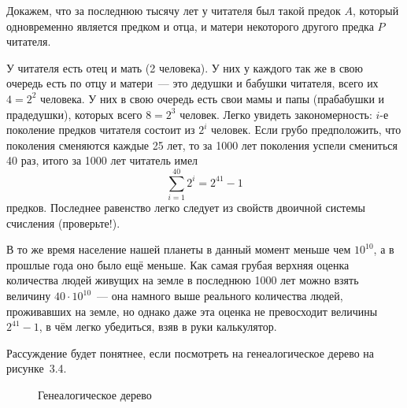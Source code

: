 \begin{example}
Докажем, что за последнюю тысячу лет у читателя был такой предок $A$, который одновременно является предком и отца, и матери некоторого другого предка $P$ читателя.

У читателя есть отец и мать (2 человека). У них у каждого так же в свою очередь есть по отцу и матери~— это дедушки и бабушки читателя, всего их $4=2^2$ человека. У них в свою очередь есть свои мамы и папы (прабабушки и прадедушки), которых всего $8=2^3$ человек. Легко увидеть закономерность: $i$-е поколение предков читателя состоит из $2^i$ человек. Если грубо предположить, что поколения сменяются каждые 25 лет, то за 1000 лет поколения успели смениться 40 раз, итого за 1000 лет читатель имел
$$\sum_{i=1}^{40} 2^i = 2^{41} - 1$$
предков. Последнее равенство легко следует из свойств двоичной системы счисления (проверьте!).

В то же время население нашей планеты в данный момент меньше чем $10^{10}$, а в прошлые года оно было ещё меньше. Как самая грубая верхняя оценка количества людей живущих на земле в последнюю 1000 лет можно взять величину $40\cdot 10^{10}$~— она намного выше реального количества людей, проживавших на земле, но однако даже эта оценка не превосходит величины $2^{41} - 1$, в чём легко убедиться, взяв в руки калькулятор.

Рассуждение будет понятнее, если посмотреть на генеалогическое дерево на рисунке~3.4.

\begin{figure}[h]
\centering
{}
\caption{Генеалогическое дерево}
\end{figure}


\end{example}
